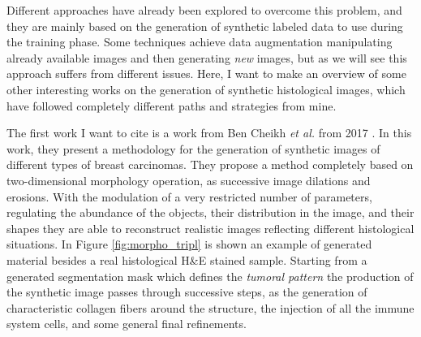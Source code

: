 Different approaches have already been explored to overcome this problem, and they are mainly based on the generation of synthetic labeled data to use during the training phase. Some techniques achieve data augmentation manipulating already available images and then generating \textit{new} images, but as we will see this approach suffers from different issues. Here, I want to make an overview of some other interesting works on the generation of synthetic histological images, which have followed completely different paths and strategies from mine.

The first work I want to cite is a work from Ben Cheikh \textit{et al.} from 2017 \cite{10.1117/12.2254452}. In this work, they present a methodology for the generation of synthetic images of different types of breast carcinomas. They propose a method completely based on two-dimensional morphology operation, as successive image dilations and erosions. With the modulation of a very restricted number of parameters, regulating the abundance of the objects, their distribution in the image, and their shapes they are able to reconstruct realistic images reflecting different histological situations. In Figure \ref{fig:morpho_tripl} is shown an example of generated material besides a real histological H\&E stained sample. Starting from a generated segmentation mask which defines the \textit{tumoral pattern} the production of the synthetic image passes through successive steps, as the generation of characteristic collagen fibers around the structure, the injection of all the immune system cells, and some general
final refinements.

